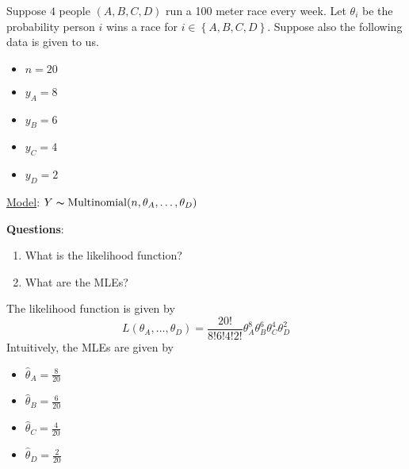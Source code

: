 \begin{exbox}
    \begin{example}
        Suppose $ 4 $ people $ (A,B,C,D) $ run a 100 meter race every week.
        Let $ \theta_i $ be the probability person $ i $ wins a race for 
        $ i\in\left\{ A,B,C,D\right\} $.
        Suppose also the following data is given to us.
        \begin{itemize}
            \item $ n=20 $
            \item $ y_A=8 $
            \item $ y_B=6 $
            \item $ y_C=4 $
            \item $ y_D=2 $
        \end{itemize}
        \underline{Model}: $ Y \thicksim \operatorname{Multinomial}(n,\theta_A,\ldots ,\theta_D) $
        
        \textbf{Questions}:
        \begin{enumerate}[label=(\alph*)]
            \item What is the likelihood function?
            \item What are the MLEs?
        \end{enumerate}
        The likelihood function is given by
        \[ L(\theta_A,\ldots ,\theta_D)=\frac{20!}{8!6!4!2!} \theta_A^8\theta_B^6\theta_C^4\theta_D^2 \]
        Intuitively, the MLEs are given by
        \begin{itemize}
            \item $ \hat{\theta}_A=\frac{8}{20} $
            \item $ \hat{\theta}_B=\frac{6}{20} $
            \item $ \hat{\theta}_C=\frac{4}{20} $
            \item $ \hat{\theta}_D=\frac{2}{20} $
        \end{itemize}
    \end{example}
\end{exbox}

